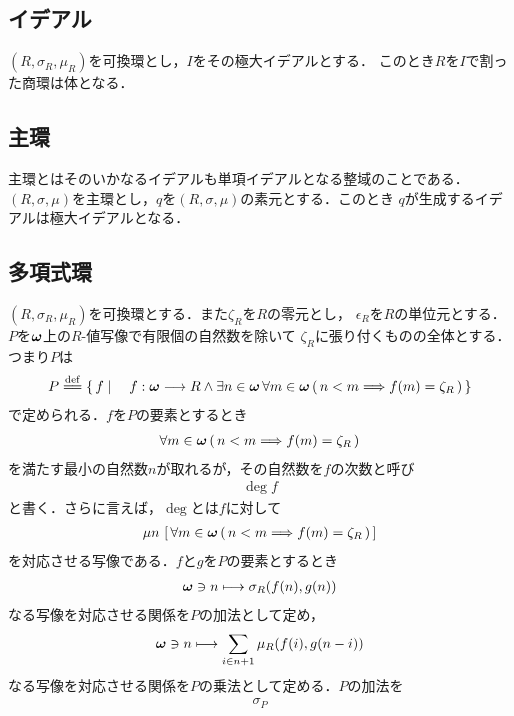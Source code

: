 \subsection{イデアル}
	$(R,\sigma_R,\mu_R)$を可換環とし，$I$をその極大イデアルとする．
	このとき$R$を$I$で割った商環は体となる．
	
\subsection{主環}
	主環とはそのいかなるイデアルも単項イデアルとなる整域のことである．
	$(R,\sigma,\mu)$を主環とし，$q$を$(R,\sigma,\mu)$の素元とする．このとき
	$q$が生成するイデアルは極大イデアルとなる．
	
\subsection{多項式環}
	$(R,\sigma_R,\mu_R)$を可換環とする．また$\zeta_R$を$R$の零元とし，
	$\epsilon_R$を$R$の単位元とする．
	$P$を${\boldsymbol \omega}$上の$R$-値写像で有限個の自然数を除いて
	$\zeta_R$に張り付くものの全体とする．つまり$P$は
	\begin{align}
		P \defeq \Set{f}{f:\Natural \longrightarrow R \wedge
		\exists n \in \Natural\, \forall m \in \Natural\,
		(\, n < m \Longrightarrow f(m) = \zeta_R\, )}
	\end{align}
	で定められる．$f$を$P$の要素とするとき
	\begin{align}
		\forall m \in {\boldsymbol \omega}\, (\, n < m \Longrightarrow f(m) = \zeta_R\, )
	\end{align}
	を満たす最小の自然数$n$が取れるが，その自然数を$f$の次数と呼び
	\begin{align}
		\deg{f}
	\end{align}
	と書く．さらに言えば，$\deg$とは$f$に対して
	\begin{align}
		\mu n\, \left[\, \forall m \in {\boldsymbol \omega}\, (\, n < m \Longrightarrow f(m) = \zeta_R\, )\, \right]
	\end{align}
	を対応させる写像である．$f$と$g$を$P$の要素とするとき
	\begin{align}
		{\boldsymbol \omega} \ni n \longmapsto \sigma_R(f(n),g(n))
	\end{align}
	なる写像を対応させる関係を$P$の加法として定め，
	\begin{align}
		{\boldsymbol \omega} \ni n \longmapsto \sum_{i \in n+1} \mu_R(f(i),g(n-i))
	\end{align}
	なる写像を対応させる関係を$P$の乗法として定める．$P$の加法を
	\begin{align}
		\sigma_P
	\end{align}
